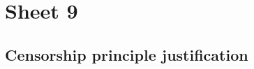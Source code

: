 \documentclass[main.tex]{subfiles}
\begin{document}
\section{Sheet 9}

\subsection{Censorship principle justification}
\end{document}
